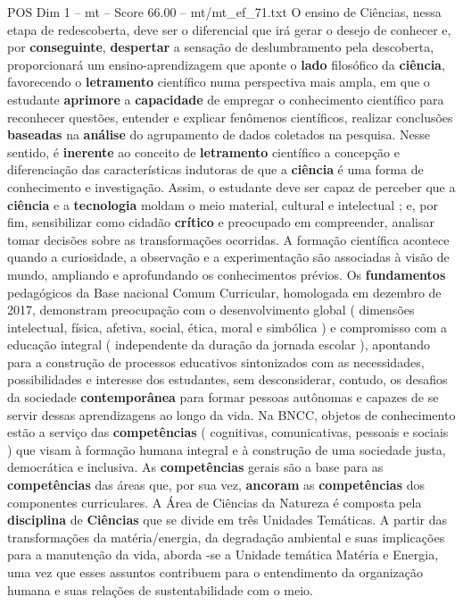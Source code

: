 \begin{textsample}{POS Dim 1 – mt – Score 66.00 – mt/mt\_ef\_71.txt}
O ensino de Ciências, nessa etapa de redescoberta, deve ser o diferencial que irá gerar o desejo de conhecer e, por \textbf{conseguinte}, \textbf{despertar} a sensação de deslumbramento pela descoberta, proporcionará um ensino-aprendizagem que aponte o \textbf{lado} filosófico da \textbf{ciência}, favorecendo o \textbf{letramento} científico numa perspectiva mais ampla, em que o estudante \textbf{aprimore} a \textbf{capacidade} de empregar o conhecimento científico para reconhecer questões, entender e explicar fenômenos científicos, realizar conclusões \textbf{baseadas} na \textbf{análise} do agrupamento de dados coletados na pesquisa.
Nesse sentido, é \textbf{inerente} ao conceito de \textbf{letramento} científico a concepção e diferenciação das características indutoras de que a \textbf{ciência} é uma forma de conhecimento e investigação.
Assim, o estudante deve ser capaz de perceber que a \textbf{ciência} e a \textbf{tecnologia} moldam o meio material, cultural e intelectual ; e, por fim, sensibilizar como cidadão \textbf{crítico} e preocupado em compreender, analisar tomar decisões sobre as transformações ocorridas.
A formação científica acontece quando a curiosidade, a observação e a experimentação são associadas à visão de mundo, ampliando e aprofundando os conhecimentos prévios.
Os \textbf{fundamentos} pedagógicos da Base nacional Comum Curricular, homologada em dezembro de 2017, demonstram preocupação com o desenvolvimento global ( dimensões intelectual, física, afetiva, social, ética, moral e simbólica ) e compromisso com a educação integral ( independente da duração da jornada escolar ), apontando para a construção de processos educativos sintonizados com as necessidades, possibilidades e interesse dos estudantes, sem desconsiderar, contudo, os desafios da sociedade \textbf{contemporânea} para formar pessoas autônomas e capazes de se servir dessas aprendizagens ao longo da vida.
Na BNCC, objetos de conhecimento estão a serviço das \textbf{competências} ( cognitivas, comunicativas, pessoais e sociais ) que visam à formação humana integral e à construção de uma sociedade justa, democrática e inclusiva.
As \textbf{competências} gerais são a base para as \textbf{competências} das áreas que, por sua vez, \textbf{ancoram} as \textbf{competências} dos componentes curriculares.
A Área de Ciências da Natureza é composta pela \textbf{disciplina} de \textbf{Ciências} que se divide em três Unidades Temáticas.
A partir das transformações da matéria/energia, da degradação ambiental e suas implicações para a manutenção da vida, aborda -se a Unidade temática Matéria e Energia, uma vez que esses assuntos contribuem para o entendimento da organização humana e suas relações de sustentabilidade com o meio.

\end{textsample}

